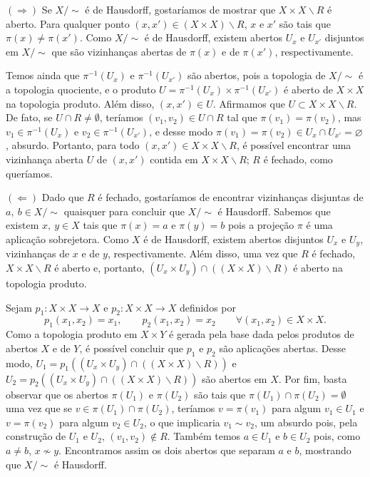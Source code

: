 \begin{dem}
    $(\Longrightarrow)$ Se $X/\sim$ é de Hausdorff, gostaríamos de mostrar que $X\times X\backslash R$ é aberto. Para qualquer ponto $(x,x')\in (X\times X)\backslash R$, $x$ e $x'$ são tais que $\pi(x)\neq \pi(x')$. Como $X/\sim$ é de Hausdorff, existem abertos $U_x$ e $U_{x'}$ disjuntos em $X/\sim$ que são vizinhanças abertas de $\pi(x)$ e de $\pi(x')$, respectivamente.%

    Temos ainda que $\pi^{-1}(U_x)$ e $\pi^{-1}(U_{x'})$ são abertos, pois a topologia de $X/\sim$ é a topologia quociente, e o produto $U=\pi^{-1}(U_x)\times \pi^{-1}(U_{x'})$ é aberto de $X\times X$ na topologia produto. Além disso, $(x,x')\in U$. Afirmamos que $U\subset X\times X\backslash R$. De fato, se $U\cap R\neq \emptyset$, teríamos $(v_1,v_2)\in U\cap R$ tal que $\pi(v_1)=\pi(v_2)$, mas $v_1 \in \pi^{-1}(U_x)$ e $v_2\in \pi^{-1}(U_{x'})$, e desse modo $\pi(v_1) = \pi(v_2) \in U_x \cap U_{x'} = \varnothing$, absurdo. Portanto, para todo $(x,x')\in X\times X\backslash R$, é possível encontrar uma vizinhança aberta $U$ de $(x,x')$ contida em $X\times X\backslash R$; $R$ é fechado, como queríamos.\newline

    $(\Longleftarrow)$ Dado que $R$ é fechado, gostaríamos de encontrar vizinhanças disjuntas de $a,~b\in X/\sim$ quaisquer para concluir que $X/\sim$ é Hausdorff. Sabemos que existem $x,~y\in X$ tais que $\pi(x)=a$ e $\pi(y)=b$ pois a projeção $\pi$ é uma aplicação sobrejetora. Como $X$ é de Hausdorff, existem abertos disjuntos $U_x$ e $U_y$, vizinhanças de $x$ e de $y$, respectivamente. Além disso, uma vez que $R$ é fechado, $X\times X\backslash R$ é aberto e, portanto, $(U_x\times U_y)\cap((X\times X)\backslash R)$ é aberto na topologia produto.

    Sejam $p_1:X\times X\rightarrow X$ e $p_2:X\times X\rightarrow X$ definidos por $$p_1(x_1,x_2)=x_1,\qquad p_2(x_1,x_2)=x_2 \qquad\forall (x_1,x_2)\in X\times X.$$ Como a topologia produto em $X\times Y$ é gerada pela base dada pelos produtos de abertos $X$ e de $Y$, é possível concluir que $p_1$ e $p_2$ são aplicações abertas. Desse modo, $U_1=p_1((U_x\times U_y)\cap((X\times X)\backslash R))$ e $U_2=p_2((U_x\times U_y)\cap((X\times X)\backslash R))$ são abertos em $X$. Por fim, basta observar que os abertos $\pi(U_1)$ e $\pi(U_2)$ são tais que $\pi(U_1)\cap \pi(U_2)=\emptyset$ uma vez que se $v\in \pi(U_1)\cap\pi(U_2)$, teríamos $v=\pi(v_1)$ para algum $v_1\in U_1$ e $v=\pi(v_2)$ para algum $v_2\in U_2$, o que implicaria $v_1\sim v_2$, um absurdo pois, pela construção de $U_1$ e $U_2$, $(v_1,v_2)\not\in R$.  Também temos $a\in U_1$ e $b\in U_2$ pois, como $a\neq b$, $x\not\sim y$. Encontramos assim os dois abertos que separam $a$ e $b$, mostrando que $X/\sim$ é Hausdorff.
\end{dem}

